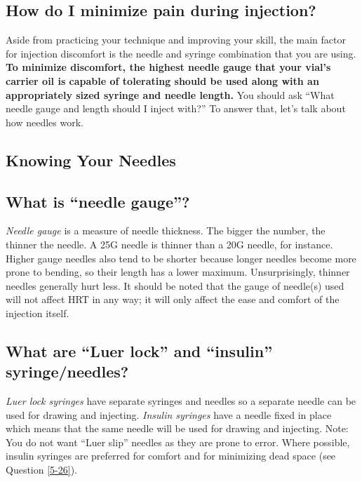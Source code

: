 \documentclass{article}
\begin{document}
\subsection{How do I minimize pain during injection?}

Aside from practicing your technique and improving your skill, the main factor for injection discomfort is the needle and syringe combination that you are using. \textbf{To minimize discomfort, the highest needle gauge that your vial’s carrier oil is capable of tolerating should be used along with an appropriately sized syringe and needle length.} You should ask “What needle gauge and length should I inject with?” To answer that, let’s talk about how needles work.

\subsection*{Knowing Your Needles}

\subsection{What is “needle gauge”?}

\textit{Needle gauge} is a measure of needle thickness. The bigger the number, the thinner the needle. A 25G needle is thinner than a 20G needle, for instance. Higher gauge needles also tend to be shorter because longer needles become more prone to bending, so their length has a lower maximum. Unsurprisingly, thinner needles generally hurt less. It should be noted that the gauge of needle(s) used will not affect HRT in any way; it will only affect the ease and comfort of the injection itself.

\subsection{What are “Luer lock” and “insulin” syringe/needles?}\label{5-13}

\textit{Luer lock syringes} have separate syringes and needles so a separate needle can be used for drawing and injecting. \textit{Insulin syringes} have a needle fixed in place which means that the same needle will be used for drawing and injecting. Note: You do not want “Luer slip” needles as they are prone to error. Where possible, insulin syringes are preferred for comfort and for minimizing dead space (see Question \ref{5-26}).
\end{document}
